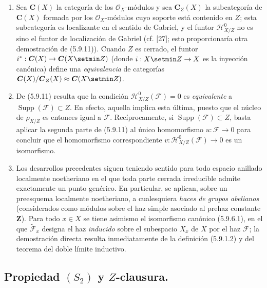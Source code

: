 \begin{remarks}[5.9.12]
\label{IV.2.s5.9.12-fr}
\begin{enumerate}
\item[(i)] Sea $\boldsymbol{C}(X)$ la categoría de los $\mathcal O_X$-módulos y
sea $\boldsymbol{C}_Z(X)$ la subcategoría de $\boldsymbol{C}(X)$ formada por los
$\mathcal O_X$-módulos cuyo soporte está contenido en $Z$; esta subcategoría es
localizante en el sentido de Gabriel, y el funtor $\mathcal H^0_{X/Z}$ no es
sino el funtor de localización de Gabriel (cf. [27]; esto proporcionaría otra
demostración de (5.9.11)). Cuando $Z$ es cerrado, el funtor
$i^*:\boldsymbol{C}(X)\to\boldsymbol{C}(X\setmin Z)$ (donde $i:X\setmin Z\to X$ es la inyección
canónica) define una \emph{equivalencia} de categorías
$\boldsymbol{C}(X)/\boldsymbol{C}_Z(X)\approx\boldsymbol{C}(X\setmin Z)$.
\item[(ii)] De (5.9.11) resulta que la condición
$\mathcal H^0_{X/Z}(\mathcal F)=0$ es \emph{equivalente} a
$\operatorname{Supp}(\mathcal F)\subset Z$. En efecto, aquella implica esta
última, puesto que el núcleo de $\rho_{X/Z}$ es entonces igual a $\mathcal F$.
Recíprocamente, si $\operatorname{Supp}(\mathcal F)\subset Z$, basta aplicar
la segunda parte de (5.9.11) al único homomorfismo
$u:\mathcal F\to0$ para concluir que el homomorfismo correspondiente
$v:\mathcal H^0_{X/Z}(\mathcal F)\to0$ es un isomorfismo.
\item[(iii)] Los desarrollos precedentes siguen teniendo sentido para todo
espacio anillado localmente noetheriano en el que toda parte cerrada
irreducible admite exactamente un punto genérico. En particular, se aplican,
sobre un preesquema localmente noetheriano, a cualesquiera \emph{haces de
grupos abelianos} (considerados como módulos sobre el haz simple asociado al
prehaz constante $\mathbf Z$). Para todo $x\in X$ se tiene asimismo el
isomorfismo canónico (5.9.6.1), en el que
$\widetilde{\mathcal F}_x$ designa el haz \emph{inducido} sobre el subespacio
$X_x$ de $X$ por el haz $\mathcal F$; la demostración directa resulta
inmediatamente de la definición (5.9.1.2) y del teorema del doble límite
inductivo.
\end{enumerate}
\end{remarks}

\subsection{\texorpdfstring{Propiedad $(S_2)$ y $Z$-clausura.}{Propiedad (S\string_2) y Z-clausura}}

